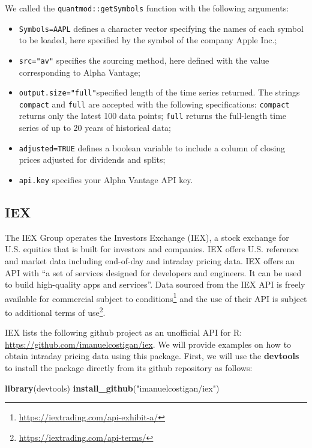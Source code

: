 \documentclass[]{book}
\newenvironment{Shaded}{\begin{snugshade}}{\end{snugshade}}
\newcommand{\KeywordTok}[1]{\textcolor[rgb]{0.13,0.29,0.53}{\textbf{#1}}}
\newcommand{\StringTok}[1]{\textcolor[rgb]{0.31,0.60,0.02}{#1}}
\newcommand{\NormalTok}[1]{#1}
\DeclareRobustCommand{\href}[2]{#2\footnote{\url{#1}}}
\providecommand{\tightlist}{%
  \setlength{\itemsep}{0pt}\setlength{\parskip}{0pt}}
\theoremstyle{definition}
\theoremstyle{definition}
\theoremstyle{definition}
\theoremstyle{remark}
\begin{document}
We called the \texttt{quantmod::getSymbols} function with the following
arguments:

\begin{itemize}
\tightlist
\item
  \texttt{Symbols=\textquotesingle{}AAPL\textquotesingle{}} defines a
  character vector specifying the names of each symbol to be loaded,
  here specified by the symbol of the company Apple Inc.;
\item
  \texttt{src="av"} specifies the sourcing method, here defined with the
  value corresponding to Alpha Vantage;
\item
  \texttt{output.size="full"}specified length of the time series
  returned. The strings \texttt{compact} and \texttt{full} are accepted
  with the following specifications: \texttt{compact} returns only the
  latest 100 data points; \texttt{full} returns the full-length time
  series of up to 20 years of historical data;
\item
  \texttt{adjusted=TRUE} defines a boolean variable to include a column
  of closing prices adjusted for dividends and splits;
\item
  \texttt{api.key} specifies your Alpha Vantage API key.
\end{itemize}

\subsection{IEX}\label{iex}

The IEX Group operates the Investors Exchange (IEX), a stock exchange
for U.S. equities that is built for investors and companies. IEX offers
U.S. reference and market data including end-of-day and intraday pricing
data. IEX offers an API with ``a set of services designed for developers
and engineers. It can be used to build high-quality apps and services''.
Data sourced from the IEX API is freely available for commercial subject
to \href{https://iextrading.com/api-exhibit-a/}{conditions} and the use
of their API is subject to additional
\href{https://iextrading.com/api-terms/}{terms of use}.

IEX lists the following github project as an unofficial API for R:
\url{https://github.com/imanuelcostigan/iex}. We will provide examples
on how to obtain intraday pricing data using this package. First, we
will use the \textbf{devtools} to install the package directly from its
github repository as follows:

\begin{Shaded}
\begin{Highlighting}[]
\KeywordTok{library}\NormalTok{(devtools)}
\KeywordTok{install_github}\NormalTok{(}\StringTok{"imanuelcostigan/iex"}\NormalTok{)}
\end{Highlighting}
\end{Shaded}
\end{document}
